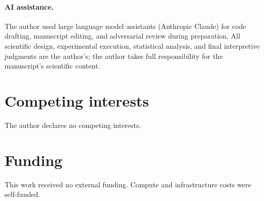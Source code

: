 \documentclass[
  11pt,
]{article}
\begin{document}
\paragraph{AI assistance.} The author used large language model assistants (Anthropic Claude) for code drafting, manuscript editing, and adversarial review during preparation. All scientific design, experimental execution, statistical analysis, and final interpretive judgments are the author's; the author takes full responsibility for the manuscript's scientific content.

\section*{Competing interests}

The author declares no competing interests.

\section*{Funding}

This work received no external funding. Compute and infrastructure costs were self-funded.



\end{document}
